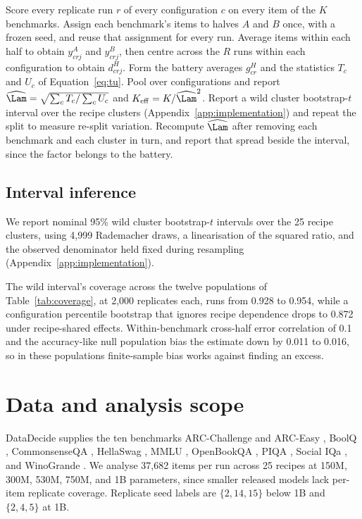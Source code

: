 \begin{algorithm}[t]
\caption{SNAP measurement recipe for a fixed battery of $K$ benchmarks scored on $R$ replicate runs per configuration.}
\label{alg:snap}
\begin{algorithmic}[1]
\STATE Score every replicate run $r$ of every configuration $c$ on every item of the $K$ benchmarks.
\STATE Assign each benchmark's items to halves $A$ and $B$ once, with a frozen seed, and reuse that assignment for every run.
\STATE Average items within each half to obtain $y^A_{crj}$ and $y^B_{crj}$, then centre across the $R$ runs within each configuration to obtain $d^H_{crj}$.
\STATE Form the battery averages $g^H_{cr}$ and the statistics $T_c$ and $U_c$ of Equation~\ref{eq:tu}.
\STATE Pool over configurations and report $\widehat\Lam=\sqrt{\sum_c T_c/\sum_c U_c}$ and $K_{\mathrm{eff}}=K/\widehat\Lam^2$.
\STATE Report a wild cluster bootstrap-$t$ interval over the recipe clusters (Appendix~\ref{app:implementation}) and repeat the split to measure re-split variation.
\STATE Recompute $\widehat\Lam$ after removing each benchmark and each cluster in turn, and report that spread beside the interval, since the factor belongs to the battery.
\end{algorithmic}
\end{algorithm}


\subsection{Interval inference}
We report nominal 95\% wild cluster bootstrap-$t$ intervals over the 25 recipe clusters, using 4,999 Rademacher draws, a linearisation of the squared ratio, and the observed denominator held fixed during resampling (Appendix~\ref{app:implementation}).

The wild interval's coverage across the twelve populations of Table~\ref{tab:coverage}, at 2,000 replicates each, runs from 0.928 to 0.954, while a configuration percentile bootstrap that ignores recipe dependence drops to 0.872 under recipe-shared effects. Within-benchmark cross-half error correlation of 0.1 and the accuracy-like null population bias the estimate down by 0.011 to 0.016, so in these populations finite-sample bias works against finding an excess.

\section{Data and analysis scope}
\label{sec:data}
DataDecide supplies the ten benchmarks ARC-Challenge and ARC-Easy \citep{clark2018arc}, BoolQ \citep{clark2019boolq}, CommonsenseQA \citep{talmor2019commonsenseqa}, HellaSwag \citep{zellers2019hellaswag}, MMLU \citep{hendrycks2021mmlu}, OpenBookQA \citep{mihaylov2018openbookqa}, PIQA \citep{bisk2020piqa}, Social IQa \citep{sap2019socialiqa}, and WinoGrande \citep{sakaguchi2020winogrande}. We analyse 37,682 items per run across 25 recipes at 150M, 300M, 530M, 750M, and 1B parameters, since smaller released models lack per-item replicate coverage. Replicate seed labels are $\{2,14,15\}$ below 1B and $\{2,4,5\}$ at 1B.

